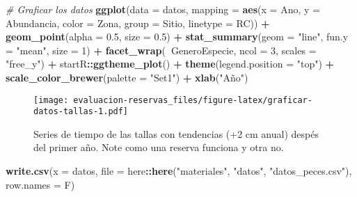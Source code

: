 \documentclass[]{krantz}
\newenvironment{Shaded}{\begin{snugshade}}{\end{snugshade}}
\newcommand{\CommentTok}[1]{\textcolor[rgb]{0.56,0.35,0.01}{\textit{#1}}}
\newcommand{\DataTypeTok}[1]{\textcolor[rgb]{0.13,0.29,0.53}{#1}}
\newcommand{\DecValTok}[1]{\textcolor[rgb]{0.00,0.00,0.81}{#1}}
\newcommand{\FloatTok}[1]{\textcolor[rgb]{0.00,0.00,0.81}{#1}}
\newcommand{\KeywordTok}[1]{\textcolor[rgb]{0.13,0.29,0.53}{\textbf{#1}}}
\newcommand{\NormalTok}[1]{#1}
\newcommand{\OperatorTok}[1]{\textcolor[rgb]{0.81,0.36,0.00}{\textbf{#1}}}
\newcommand{\StringTok}[1]{\textcolor[rgb]{0.31,0.60,0.02}{#1}}
\begin{document}
\begin{Shaded}
\begin{Highlighting}[]
\CommentTok{# Graficar los datos}
\KeywordTok{ggplot}\NormalTok{(}\DataTypeTok{data =}\NormalTok{ datos,}
       \DataTypeTok{mapping =} \KeywordTok{aes}\NormalTok{(}\DataTypeTok{x =}\NormalTok{ Ano, }\DataTypeTok{y =}\NormalTok{ Abundancia,}
                     \DataTypeTok{color =}\NormalTok{ Zona, }\DataTypeTok{group =}\NormalTok{ Sitio, }\DataTypeTok{linetype =}\NormalTok{ RC)) }\OperatorTok{+}
\StringTok{  }\KeywordTok{geom_point}\NormalTok{(}\DataTypeTok{alpha =} \FloatTok{0.5}\NormalTok{, }\DataTypeTok{size =} \FloatTok{0.5}\NormalTok{) }\OperatorTok{+}
\StringTok{  }\KeywordTok{stat_summary}\NormalTok{(}\DataTypeTok{geom =} \StringTok{"line"}\NormalTok{, }\DataTypeTok{fun.y =} \StringTok{"mean"}\NormalTok{, }\DataTypeTok{size =} \DecValTok{1}\NormalTok{) }\OperatorTok{+}
\StringTok{  }\KeywordTok{facet_wrap}\NormalTok{(}\OperatorTok{~}\NormalTok{GeneroEspecie, }\DataTypeTok{ncol =} \DecValTok{3}\NormalTok{, }\DataTypeTok{scales =} \StringTok{"free_y"}\NormalTok{) }\OperatorTok{+}
\StringTok{  }\NormalTok{startR}\OperatorTok{::}\KeywordTok{ggtheme_plot}\NormalTok{() }\OperatorTok{+}
\StringTok{  }\KeywordTok{theme}\NormalTok{(}\DataTypeTok{legend.position =} \StringTok{"top"}\NormalTok{) }\OperatorTok{+}
\StringTok{  }\KeywordTok{scale_color_brewer}\NormalTok{(}\DataTypeTok{palette =} \StringTok{"Set1"}\NormalTok{) }\OperatorTok{+}
\StringTok{  }\KeywordTok{xlab}\NormalTok{(}\StringTok{"Año"}\NormalTok{)}
\end{Highlighting}
\end{Shaded}

\begin{figure}
\centering
\texttt{[image: evaluacion-reservas\_files/figure-latex/graficar-datos-tallas-1.pdf]}
\caption{\label{fig:graficar-datos-tallas}Series de tiempo de las tallas con
tendencias (+2 cm anual) despés del primer año. Note como una reserva
funciona y otra no.}
\end{figure}

\begin{Shaded}
\begin{Highlighting}[]
\KeywordTok{write.csv}\NormalTok{(}\DataTypeTok{x =}\NormalTok{ datos,}
          \DataTypeTok{file =}\NormalTok{ here}\OperatorTok{::}\KeywordTok{here}\NormalTok{(}\StringTok{"materiales"}\NormalTok{, }\StringTok{"datos"}\NormalTok{, }\StringTok{"datos_peces.csv"}\NormalTok{),}
          \DataTypeTok{row.names =}\NormalTok{ F)}
\end{Highlighting}
\end{Shaded}
\end{document}
